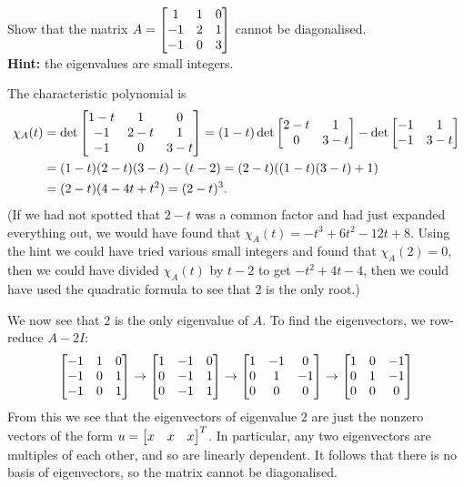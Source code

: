 \documentclass[a4paper]{amsart}
\renewenvironment{solution}{\SolutionInline}{\endSolutionInline}
\begin{document}
\begin{exercise}\label{ex-diagonal-vi}
 Show that the matrix $A=\left[\begin{matrix} 1&1&0\\ -1&2&1\\ -1&0&3\end{matrix}\right]$ cannot be
 diagonalised.\\
 \textbf{Hint:} the eigenvalues are small integers.
\end{exercise}
\begin{solution}
 The characteristic polynomial is
 \begin{align*}
  \chi_A(t) &= 
   \det\left[\begin{matrix} 1-t & 1   & 0 \\
           -1   & 2-t & 1 \\
           -1   & 0   & 3-t \end{matrix}\right] 
   = (1-t) \det\left[\begin{matrix} 2-t&1 \\ 0&3-t \end{matrix}\right] - \det\left[\begin{matrix} -1&1 \\ -1&3-t \end{matrix}\right] \\
   &= (1-t)(2-t)(3-t) - (t-2) 
    = (2-t)((1-t)(3-t)+1) \\
   &= (2-t)(4-4t+t^2) = (2-t)^3.
 \end{align*}
 (If we had not spotted that $2-t$ was a common factor and had just
 expanded everything out, we would have found that
 $\chi_A(t)=-t^3+6t^2-12t+8$.  Using the hint we could have tried
 various small integers and found that $\chi_A(2)=0$, then we could
 have divided $\chi_A(t)$ by $t-2$ to get $-t^2+4t-4$, then we could
 have used the quadratic formula to see that $2$ is the only root.)

 We now see that $2$ is the only eigenvalue of $A$.  To find the
 eigenvectors, we row-reduce $A-2I$:
 \[ \left[\begin{matrix} -1&1&0 \\ -1&0&1 \\ -1&0&1 \end{matrix}\right] 
    \to 
    \left[\begin{matrix} 1&-1&0 \\ 0&-1&1 \\ 0&-1&1 \end{matrix}\right]
    \to
    \left[\begin{matrix} 1&-1&0 \\ 0&1&-1 \\ 0&0&0 \end{matrix}\right]
    \to
    \left[\begin{matrix} 1&0&-1 \\ 0&1&-1 \\ 0&0&0 \end{matrix}\right]
 \]
 From this we see that the eigenvectors of eigenvalue $2$ are just the
 nonzero vectors of the form $u=\left[\begin{matrix} x&x&x\end{matrix}\right]^T$.  In particular, any
 two eigenvectors are multiples of each other, and so are linearly
 dependent.  It follows that there is no basis of eigenvectors, so the
 matrix cannot be diagonalised.
\end{solution}
\end{document}
